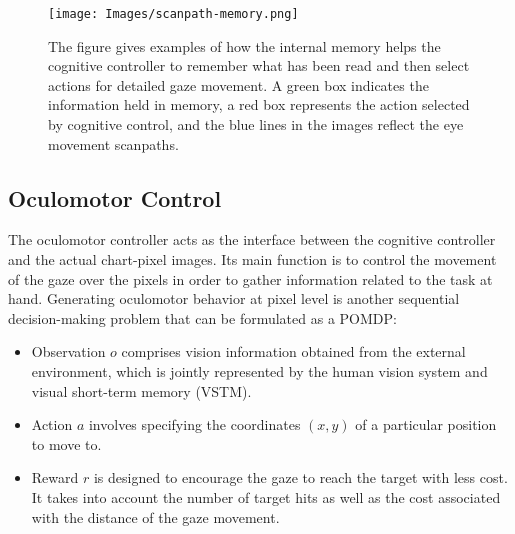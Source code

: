 \begin{figure*}[!t]
\centering
  \texttt{[image: Images/scanpath-memory.png]}
  \caption{The figure gives examples of how the internal memory helps the cognitive controller to remember what has been read and then select actions for detailed gaze movement. A green box indicates the information held in memory, a red box represents the action selected by cognitive control, and the blue lines in the images reflect the eye movement scanpaths.}
  \label{fig:memory}
\end{figure*}

\subsection{Oculomotor Control}

The oculomotor controller acts as the interface between the cognitive controller and the actual chart-pixel images. Its main function is to control the movement of the gaze over the pixels in order to gather information related to the task at hand.
Generating oculomotor behavior at pixel level is another sequential decision-making problem that can be formulated as a POMDP:
\begin{itemize}
    \item Observation $o$ comprises vision information obtained from the external environment, which is jointly represented by the human vision system and visual short-term memory (VSTM).
    \item Action $a$  involves specifying the coordinates $(x, y)$ of a particular position to move to.
    \item Reward $r$ is designed to encourage the gaze to reach the target with less cost. It takes into account the number of target hits as well as the cost associated with the distance of the gaze movement.
\end{itemize}

